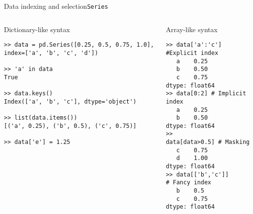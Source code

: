 \documentclass[10pt,compress]{beamer} %
\begin{document}
\begin{frame}[fragile]{Data indexing and selection}{\texttt{Series}}
	\begin{columns}
		\begin{exampleblock}{Dictionary-like syntax}
		\vspace{-0.2cm} 
			\begin{lstlisting}
>> data = pd.Series([0.25, 0.5, 0.75, 1.0], index=['a', 'b', 'c', 'd'])

>> 'a' in data
True

>> data.keys()
Index(['a', 'b', 'c'], dtype='object')

>> list(data.items())
[('a', 0.25), ('b', 0.5), ('c', 0.75)]

>> data['e'] = 1.25
\end{lstlisting}
			\vspace{-0.2cm} 
		\end{exampleblock}

		\begin{exampleblock}{Array-like syntax}
			\vspace{-0.2cm} 
			\begin{lstlisting}
>> data['a':'c'] #Explicit index
   a    0.25
   b    0.50
   c    0.75
dtype: float64
>> data[0:2] # Implicit index
   a    0.25
   b    0.50
dtype: float64
>> data[data>0.5] # Masking
   c    0.75
   d    1.00
dtype: float64
>> data[['b','c']] # Fancy index
   b    0.5
   c    0.75
dtype: float64
\end{lstlisting}
			\vspace{-0.2cm} 
		\end{exampleblock}
	\end{columns}
\end{frame}
\end{document}
